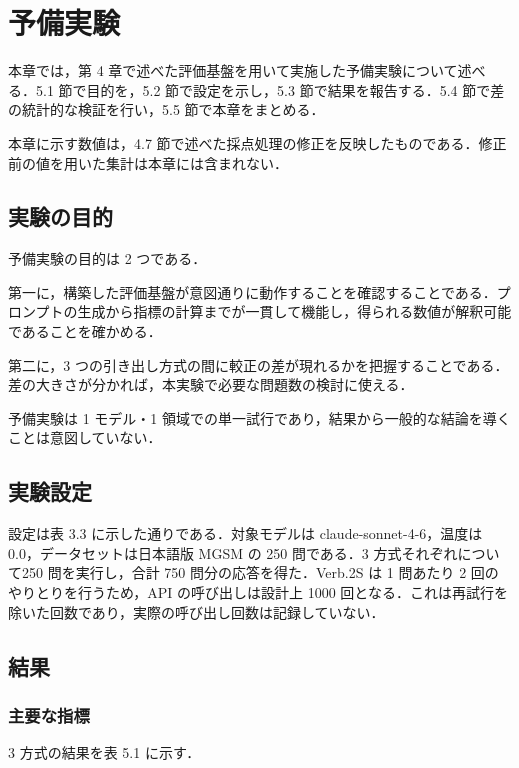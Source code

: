 \section{予備実験}

本章では，第 4 章で述べた評価基盤を用いて実施した予備実験について述べる．5.1 節で目的を，5.2 節で設定を示し，5.3 節で結果を報告する．5.4 節で差の統計的な検証を行い，5.5 節で本章をまとめる．

本章に示す数値は，4.7 節で述べた採点処理の修正を反映したものである．修正前の値を用いた集計は本章には含まれない．

\subsection{実験の目的}

予備実験の目的は 2 つである．

第一に，構築した評価基盤が意図通りに動作することを確認することである．プロンプトの生成から指標の計算までが一貫して機能し，得られる数値が解釈可能であることを確かめる．

第二に，3 つの引き出し方式の間に較正の差が現れるかを把握することである．差の大きさが分かれば，本実験で必要な問題数の検討に使える．

予備実験は 1 モデル・1 領域での単一試行であり，結果から一般的な結論を導くことは意図していない．

\subsection{実験設定}

設定は表 3.3 に示した通りである．対象モデルは claude-sonnet-4-6，温度は0.0，データセットは日本語版 MGSM の 250 問である．3 方式それぞれについて250 問を実行し，合計 750 問分の応答を得た．Verb.2S は 1 問あたり 2 回のやりとりを行うため，API の呼び出しは設計上 1000 回となる．これは再試行を除いた回数であり，実際の呼び出し回数は記録していない．

\subsection{結果}

\subsubsection{主要な指標}

3 方式の結果を表 5.1 に示す．

